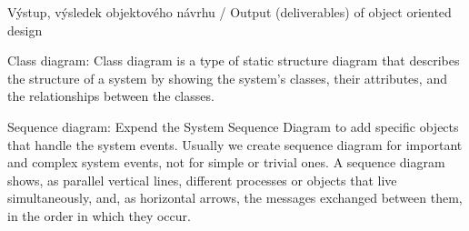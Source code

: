 \begin{obecne}{Výstup, výsledek objektového návrhu / Output (deliverables) of object oriented design}
\begin{pitemize}
    \item Class diagram: Class diagram is a type of static structure diagram that describes the structure of a system by showing the system's classes, their attributes, and the relationships between the classes.
    \item Sequence diagram: Expend the System Sequence Diagram to add specific objects that handle the system events. Usually we create sequence diagram for important and complex system events, not for simple or trivial ones. A sequence diagram shows, as parallel vertical lines, different processes or objects that live simultaneously, and, as horizontal arrows, the messages exchanged between them, in the order in which they occur.
\end{pitemize}
\end{obecne}


